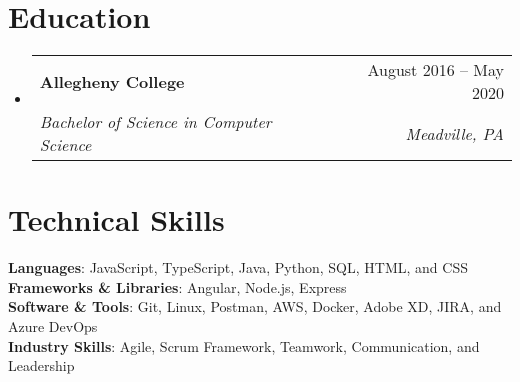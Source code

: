 \documentclass[letterpaper,12pt]{article}
\makeatletter
\newcommand{\resumeItem}[1]{
  \item\small{
    {#1 \vspace{-1pt}}
  }
}
\newcommand{\resumeSubheading}[4]{
  \vspace{2pt}\item
    \begin{tabular*}{0.97\textwidth}[t]{l@{\extracolsep{\fill}}r}
      \textbf{#1} & #2 \\
      \textit{\small#3} & \textit{\small #4} \\
    \end{tabular*}\vspace{-7pt}
}
\newcommand{\resumeSubHeadingListStart}{\begin{itemize}[leftmargin=0.15in, label={}]}
\newcommand{\resumeSubHeadingListEnd}{\end{itemize}}
\newcommand{\resumeItemListStart}{\begin{itemize}}
\newcommand{\resumeItemListEnd}{\end{itemize}\vspace{5pt}}
\makeatother
\begin{document}
\section{Education}
\resumeSubHeadingListStart
\resumeSubheading
{Allegheny College}{August 2016 -- May 2020}
{Bachelor of Science in Computer Science}{Meadville, PA}
\resumeSubHeadingListEnd




\section{Technical Skills}
\begin{itemize}[leftmargin=0.15in, label={}]
\small{\item{
\textbf{Languages}{: JavaScript, TypeScript, Java, Python, SQL, HTML, and CSS} \\
\textbf{Frameworks \& Libraries}{: Angular, Node.js, Express} \\
\textbf{Software \& Tools}{: Git, Linux, Postman, AWS, Docker, Adobe XD, JIRA, and Azure DevOps} \\
\textbf{Industry Skills}{:  Agile, Scrum Framework, Teamwork, Communication, and Leadership} \\
}}
\end{itemize}


\end{document}

